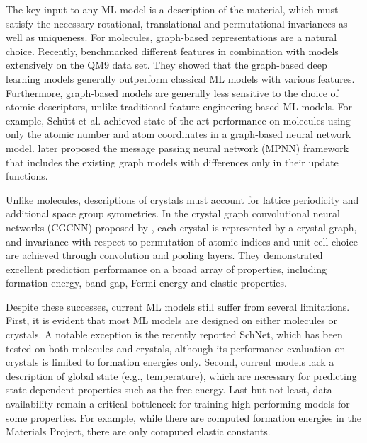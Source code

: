\documentclass[manuscript=article]{achemso}
\begin{document}
The key input to any ML model is a description of the material, which must satisfy the necessary rotational, translational and permutational invariances as well as uniqueness. For molecules, graph-based representations\cite{Bonchev1991} are a natural choice. Recently, \citet{Faber2017} benchmarked different features in combination with models extensively on the QM9 data set.\cite{Ramakrishnan2014} They showed that the graph-based deep learning models\cite{Kearnes2016a, li2015gated} generally outperform classical ML models with various features. Furthermore, graph-based models are generally less sensitive to the choice of atomic descriptors, unlike traditional feature engineering-based ML models. For example, Sch{\"u}tt et al.\cite{Schutt2017,Schutt2018} achieved state-of-the-art performance on molecules using only the atomic number and atom coordinates in a graph-based neural network model.  \citet{gilmer2017neural} later proposed the message passing neural network (MPNN) framework that includes the existing graph models with differences only in their update functions. 

Unlike molecules, descriptions of crystals must account for lattice periodicity and additional space group symmetries. In the crystal graph convolutional neural networks (CGCNN) proposed by \citet{Xie2017}, each crystal is represented by a crystal graph, and invariance with respect to permutation of atomic indices and unit cell choice are achieved through convolution and pooling layers. They demonstrated excellent prediction performance on a broad array of properties, including formation energy, band gap, Fermi energy and elastic properties.

Despite these successes, current ML models still suffer from several limitations. First, it is evident that most ML models are designed on either molecules or crystals. A notable exception is the recently reported SchNet,\cite{Schutt2018} which has been tested on both molecules and crystals, although its performance evaluation on crystals is limited to formation energies only. Second, current models lack a description of global state (e.g., temperature), which are necessary for predicting state-dependent properties such as the free energy. Last but not least, data availability remain a critical bottleneck for training high-performing models for some properties. For example, while there are  computed formation energies in the Materials Project, \cite{Jain2013} there are only  computed elastic constants.
\end{document}
